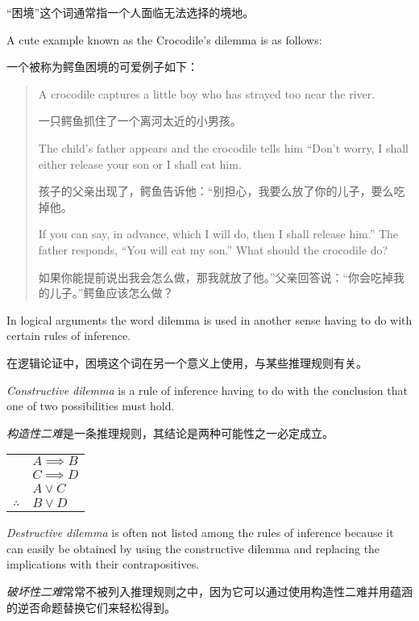 “困境”这个词通常指一个人面临无法选择的境地。

A cute example known as the 
Crocodile's dilemma is as follows:

一个被称为鳄鱼困境的可爱例子如下：

\begin{quote}
A crocodile captures a little boy who has strayed too near the river.

一只鳄鱼抓住了一个离河太近的小男孩。

The 
child's father appears and the crocodile tells him ``Don't worry, I shall 
either release your son or I shall eat him.

孩子的父亲出现了，鳄鱼告诉他：“别担心，我要么放了你的儿子，要么吃掉他。

If you can say, in advance,
which I will do, then I shall release him.''  The father responds, ``You will
eat my son.''  What should the crocodile do?

如果你能提前说出我会怎么做，那我就放了他。”父亲回答说：“你会吃掉我的儿子。”鳄鱼应该怎么做？
\end{quote} 

In logical arguments the word dilemma is used in another sense having to
do with certain rules of inference.

在逻辑论证中，困境这个词在另一个意义上使用，与某些推理规则有关。

\emph{Constructive dilemma} is 
a rule of inference having to do with the conclusion that one of two 
possibilities must hold.

\emph{构造性二难}是一条推理规则，其结论是两种可能性之一必定成立。

\begin{center}
\begin{tabular}{cl}
 & $A \implies B$ \\
 & $C \implies D$ \\ 
 & $A \lor C$ \\ \hline
$\therefore$ & $B \lor D$ \\
\end{tabular}
\end{center}

\emph{Destructive dilemma} 
is often not listed among the rules
of inference because it can easily be obtained by using the constructive
dilemma and replacing the implications with their contrapositives.

\emph{破坏性二难}常常不被列入推理规则之中，因为它可以通过使用构造性二难并用蕴涵的逆否命题替换它们来轻松得到。


